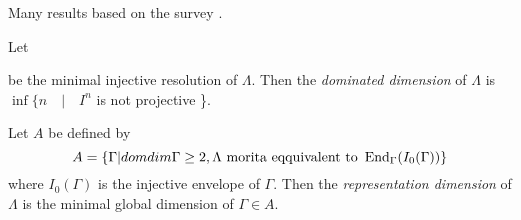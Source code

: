 
Many results based on the survey \cite{Opp09}.

\begin{defn}
	Let 
	\begin{center}
	\end{center}
	be the minimal injective resolution of $\Lambda$. Then the \emph{dominated dimension} of $\Lambda$ is $\inf\{n \quad | \quad I^n$ is not projective \}.
\end{defn}

\begin{defn} 
	Let $A$ be defined by $$A = \{\Gamma | domdim\Gamma \geq 2, \Lambda \text{ morita eqquivalent to } \operatorname{End}_\Gamma(I_0(\Gamma))\}$$ where $I_0(\Gamma)$ is the injective envelope of $\Gamma$. Then the \emph{representation dimension} of $\Lambda$ is the minimal global dimension of $\Gamma \in A$.
\end{defn}

